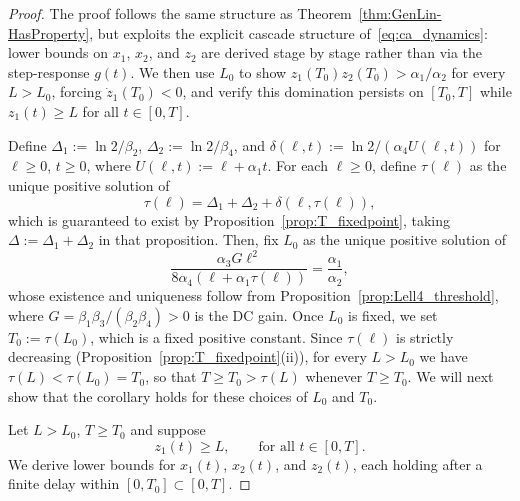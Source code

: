 \documentclass{article}
\begin{document}
\begin{proof}
The proof follows the same structure as Theorem~\ref{thm:GenLin-HasProperty}, 
but exploits the explicit cascade structure of~\eqref{eq:ca_dynamics}: lower 
bounds on $x_1$, $x_2$, and $z_2$ are derived stage by stage rather than 
via the step-response $g(t)$. We then use $L_0$ to show 
$z_1(T_0)z_2(T_0)>\alpha_1/\alpha_2$ for every $L>L_0$, forcing 
$\dot z_1(T_0)<0$, and verify this domination persists on $[T_0,T]$ while 
$z_1(t)\ge L$ for all $t\in[0,T]$.

Define $\Delta_1 := \ln 2/\beta_2$, $\Delta_2 := \ln 2/\beta_4$, and 
$\delta(\ell,t) := \ln 2/(\alpha_4 U(\ell,t))$ for $\ell\ge0$, $t\ge 0$, 
where $U(\ell,t):=\ell+\alpha_1 t$. For each $\ell\ge0$, define $\tau(\ell)$ 
as the unique positive solution of
\begin{equation*}
    \tau(\ell) = \Delta_1 + \Delta_2 + \delta(\ell,\tau(\ell)),
\end{equation*}
which is guaranteed to exist by Proposition~\ref{prop:T_fixedpoint}, 
taking $\Delta := \Delta_1+\Delta_2$ in that proposition. Then, fix $L_0$ as the unique positive solution of
\begin{equation*}
    \frac{\alpha_3 G\ell^2}{8\alpha_4(\ell+\alpha_1\tau(\ell))} = \frac{\alpha_1}{\alpha_2},
\end{equation*}
whose existence and uniqueness follow from Proposition~\ref{prop:Lell4_threshold},
where $G = \beta_1\beta_3/(\beta_2\beta_4)>0$ is the DC gain.
Once $L_0$ is fixed, we set $T_0:=\tau(L_0)$, which is a fixed positive 
constant. Since $\tau(\ell)$ is strictly decreasing 
(Proposition~\ref{prop:T_fixedpoint}(ii)), for every $L>L_0$ we have 
$\tau(L)<\tau(L_0)=T_0$, so that $T\ge T_0>\tau(L)$ whenever $T\ge T_0$. 
We will next show that the corollary holds for these choices of $L_0$ and $T_0$.

Let $L>L_0$, $T\ge T_0$ and suppose
\begin{equation}\label{eq:z1_low}
    z_1(t)\ge L, \qquad \text{for all } t\in[0,T].
\end{equation}
We derive lower bounds for $x_1(t)$, $x_2(t)$, and $z_2(t)$, each holding 
after a finite delay within $[0,T_0]\subset[0,T]$.


\end{proof}
\end{document}
